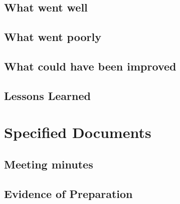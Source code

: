 \documentclass[a4paper]{report}
\begin{document}
\section{What went well}
\section{What went poorly}
\section{What could have been improved}
\section{Lessons Learned}

\chapter{Specified Documents}
\section{Meeting minutes}
\section{Evidence of Preparation}
\end{document}
